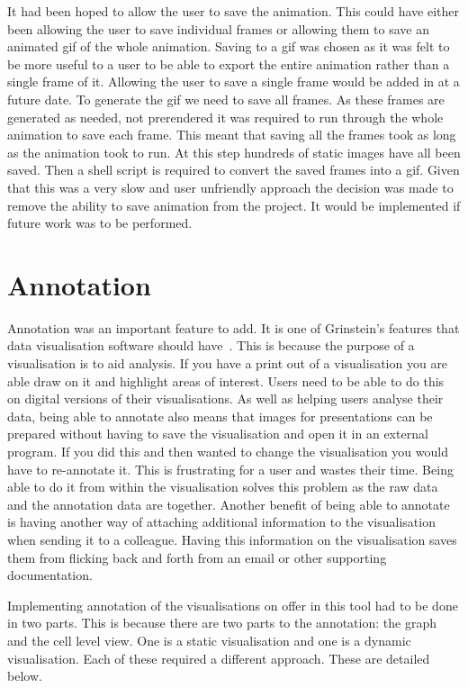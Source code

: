 It had been hoped to allow the user to save the animation.  This could have either been allowing the user to save individual frames or allowing them to save an animated gif of the whole animation.  Saving to a gif was chosen as it was felt to be more useful to a user to be able to export the entire animation rather than a single frame of it.  Allowing the user to save a single frame would be added in at a future date.  To generate the gif we need to save all frames.  As these frames are generated as needed, not prerendered it was required to run through the whole animation to save each frame.  This meant that saving all the frames took as long as the animation took to run.  At this step hundreds of static images have all been saved.  Then a shell script is required to convert the saved frames into a gif.  Given that this was a very slow and user unfriendly approach the decision was made to remove the ability to save animation from the project.  It would be implemented if future work was to be performed.

\section{Annotation}

Annotation was an important feature to add.  It is one of Grinstein's features that data visualisation software should have~\cite{gg_vizbi}.  This is because the purpose of a visualisation is to aid analysis.  If you have a print out of a visualisation you are able draw on it and highlight areas of interest.  Users need to be able to do this on digital versions of their visualisations.  As well as helping users analyse their data, being able to annotate also means that images for presentations can be prepared without having to save the visualisation and open it in an external program.  If you did this and then wanted to change the visualisation you would have to re-annotate it.  This is frustrating for a user and wastes their time.  Being able to do it from within the visualisation solves this problem as the raw data and the annotation data are together.  Another benefit of being able to annotate is having another way of attaching additional information to the visualisation when sending it to a colleague. Having this information on the visualisation saves them from flicking back and forth from an email or other supporting documentation.

Implementing annotation of the visualisations on offer in this tool had to be done in two parts.  This is because there are two parts to the annotation:  the graph and the cell level view.  One is a static visualisation and one is a dynamic visualisation.  Each of these required a different approach.  These are detailed below.

